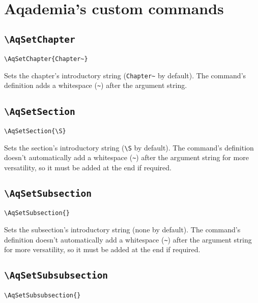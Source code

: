 \chapter{Aqademia's custom commands}

\section{\texttt{\textbackslash{}AqSetChapter}}

\begin{lstlisting}[language=Tex]
\AqSetChapter{Chapter~}
\end{lstlisting}

Sets the chapter's introductory string (\texttt{Chapter\~{}} by default).
The command's definition adds a whitespace (\texttt{\~{}}) after the argument string.

\section{\texttt{\textbackslash{}AqSetSection}}

\begin{lstlisting}[language=Tex]
\AqSetSection{\S}
\end{lstlisting}

Sets the section's introductory string (\texttt{\textbackslash{}S} by default).
The command's definition doesn't automatically add a whitespace (\texttt{\~{}}) after the argument string for more versatility, so it must be added at the end if required.

\section{\texttt{\textbackslash{}AqSetSubsection}}

\begin{lstlisting}[language=Tex]
\AqSetSubsection{}
\end{lstlisting}

Sets the subsection's introductory string (none by default).
The command's definition doesn't automatically add a whitespace (\texttt{\~{}}) after the argument string for more versatility, so it must be added at the end if required.

\section{\texttt{\textbackslash{}AqSetSubsubsection}}

\begin{lstlisting}[language=Tex]
\AqSetSubsubsection{}
\end{lstlisting}

